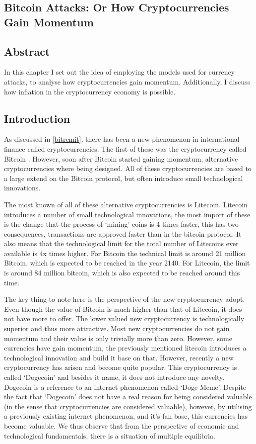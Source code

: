 \begin{refsection}
\chapter{Bitcoin Attacks: Or How Cryptocurrencies Gain Momentum}
\label{bitatt}
\section*{Abstract}
In this chapter I set out the idea of employing the models used for currency attacks,
to analyse how cryptocurrencies gain momentum.
Additionally, I discuss how inflation in the cryptocurrency economy is possible.
\pagebreak

\section{Introduction}
As discussed in \autoref{bitremit}, there has been a new phenomenon in international finance called cryptocurrencies.
The first of these was the cryptocurrency called Bitcoin \parencite{nakamoto2008bitcoin}.
However, soon after Bitcoin started gaining momentum, alternative cryptocurrencies where being designed.
All of these cryptocurrencies are based to a large extend on the Bitcoin protocol,
but often introduce small technological innovations.

The most known of all of these alternative cryptocurrencies is Litecoin. Litecoin introduces a number of small technological innovations,
the most import of these is the change that the process of `mining' coins is 4 times faster,
this has two consequences, transactions are approved faster than in the bitcoin protocol.
It also means that the technological limit for the total number of Litecoins ever available is 4x times higher.
For Bitcoin the technical limit is around 21 million Bitcoin, which is expected to be reached in the year 2140.
For Litecoin, the limit is around 84 million bitcoin, which is also expected to be reached around this time.

The key thing to note here is the perspective of the new cryptocurrency adopt.
Even though the value of Bitcoin is much higher than that of Litecoin, it does not have more to offer.
The lower valued new cryptocurrency is technologically superior and thus more attractive.
Most new cryptocurrencies do not gain momentum and their value is only trivially more than zero.
However, some currencies have gain momentum,
the previously mentioned litecoin introduces a technological innovation and build it base on that.
However, recently a new cryptocurrency has arisen and become quite popular.
This cryptocurrency is called `Dogecoin' and besides it name, it does not introduce any novelty.
Dogecoin is a reference to an internet phenomenon called `Doge Meme'.
Despite the fact that `Dogecoin' does not have a real reason for being considered valuable
(in the sense that cryptocurrencies are considered valuable),
however, by utilising a previously existing internet phenomenon, and it's fan base, this currencies has become valuable.
We thus observe that from the perspective of economic and technological fundamentals,
there is a situation of multiple equilibria.


\end{refsection}
